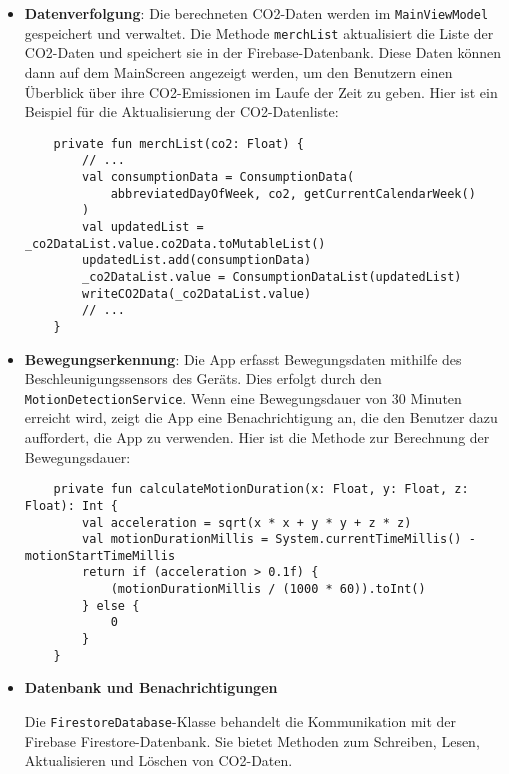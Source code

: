 \documentclass{article}
\begin{document}
\begin{itemize}
    xxxx:
    
    \begin{lstlisting}
   \textcolor{red}{ToDo}
   
   
    \end{lstlisting}
    
    
    
        \item \textbf{Datenverfolgung}:
    Die berechneten CO2-Daten werden im \texttt{MainViewModel} gespeichert und verwaltet. Die Methode \texttt{merchList} aktualisiert die Liste der CO2-Daten und speichert sie in der Firebase-Datenbank. Diese Daten können dann auf dem MainScreen angezeigt werden, um den Benutzern einen Überblick über ihre CO2-Emissionen im Laufe der Zeit zu geben. Hier ist ein Beispiel für die Aktualisierung der CO2-Datenliste:
    
    \begin{lstlisting}
    private fun merchList(co2: Float) {
        // ...
        val consumptionData = ConsumptionData(
            abbreviatedDayOfWeek, co2, getCurrentCalendarWeek()
        )
        val updatedList = _co2DataList.value.co2Data.toMutableList()
        updatedList.add(consumptionData)
        _co2DataList.value = ConsumptionDataList(updatedList)
        writeCO2Data(_co2DataList.value)
        // ...
    }
    \end{lstlisting}

    \item \textbf{Bewegungserkennung}:
    Die App erfasst Bewegungsdaten mithilfe des Beschleunigungssensors des Geräts. Dies erfolgt durch den \texttt{MotionDetectionService}. Wenn eine Bewegungsdauer von 30 Minuten erreicht wird, zeigt die App eine Benachrichtigung an, die den Benutzer dazu auffordert, die App zu verwenden. Hier ist die Methode zur Berechnung der Bewegungsdauer:
    
    \begin{lstlisting}
    private fun calculateMotionDuration(x: Float, y: Float, z: Float): Int {
        val acceleration = sqrt(x * x + y * y + z * z)
        val motionDurationMillis = System.currentTimeMillis() - motionStartTimeMillis
        return if (acceleration > 0.1f) {
            (motionDurationMillis / (1000 * 60)).toInt()
        } else {
            0
        }
    }
    \end{lstlisting}


\item \textbf{Datenbank und Benachrichtigungen}

Die \texttt{FirestoreDatabase}-Klasse behandelt die Kommunikation mit der Firebase Firestore-Datenbank. Sie bietet Methoden zum Schreiben, Lesen, Aktualisieren und Löschen von CO2-Daten.


\end{itemize}
\end{document}
